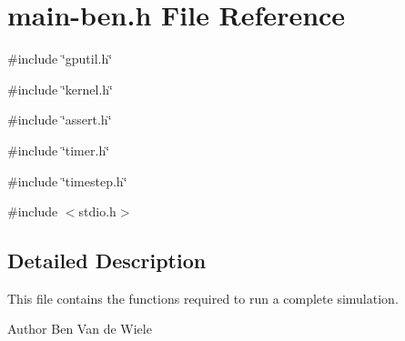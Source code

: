 \hypertarget{main-ben_8h}{
\section{main-\/ben.h File Reference}
\label{main-ben_8h}
}
{\ttfamily \#include \char`\"{}gputil.h\char`\"{}}\par
{\ttfamily \#include \char`\"{}kernel.h\char`\"{}}\par
{\ttfamily \#include \char`\"{}assert.h\char`\"{}}\par
{\ttfamily \#include \char`\"{}timer.h\char`\"{}}\par
{\ttfamily \#include \char`\"{}timestep.h\char`\"{}}\par
{\ttfamily \#include $<$stdio.h$>$}\par


\subsection{Detailed Description}
This file contains the functions required to run a complete simulation.

\begin{DoxyAuthor}{Author}
Ben Van de Wiele 
\end{DoxyAuthor}
